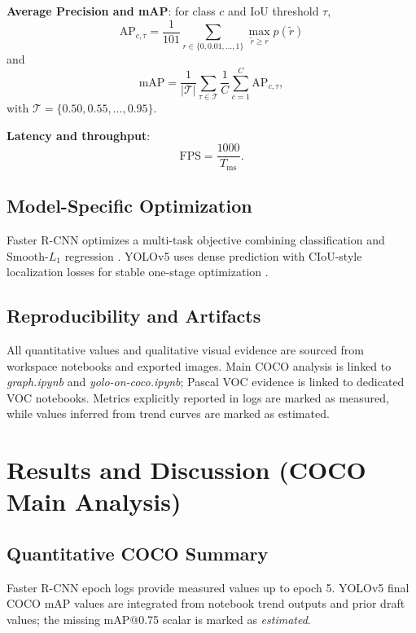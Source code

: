 \documentclass[conference]{IEEEtran}
\begin{document}
\textbf{Average Precision and mAP}: for class $c$ and IoU threshold $\tau$,
\begin{equation}
\mathrm{AP}_{c,\tau}=\frac{1}{101}\sum_{r\in\{0,0.01,\dots,1\}}\max_{\tilde r\ge r}p(\tilde r)
\end{equation}
and
\begin{equation}
\mathrm{mAP}=\frac{1}{|\mathcal{T}|}\sum_{\tau\in\mathcal{T}}\frac{1}{C}\sum_{c=1}^{C}\mathrm{AP}_{c,\tau},
\end{equation}
with $\mathcal{T}=\{0.50,0.55,\dots,0.95\}$.

\textbf{Latency and throughput}:
\begin{equation}
\mathrm{FPS}=\frac{1000}{T_{\mathrm{ms}}}.
\end{equation}

\subsection{Model-Specific Optimization}
Faster R-CNN optimizes a multi-task objective combining classification and Smooth-$L_1$ regression \cite{ren2015faster}. YOLOv5 uses dense prediction with CIoU-style localization losses for stable one-stage optimization \cite{yolov5}.

\subsection{Reproducibility and Artifacts}
All quantitative values and qualitative visual evidence are sourced from workspace notebooks and exported images. Main COCO analysis is linked to \textit{graph.ipynb} and \textit{yolo-on-coco.ipynb}; Pascal VOC evidence is linked to dedicated VOC notebooks. Metrics explicitly reported in logs are marked as measured, while values inferred from trend curves are marked as estimated.

\section{Results and Discussion (COCO Main Analysis)}
\subsection{Quantitative COCO Summary}
Faster R-CNN epoch logs provide measured values up to epoch 5. YOLOv5 final COCO mAP values are integrated from notebook trend outputs and prior draft values; the missing mAP@0.75 scalar is marked as \textit{estimated}.
\end{document}
